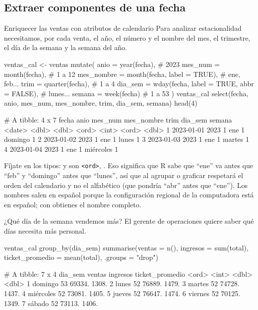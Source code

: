 \subsection{Extraer componentes de una fecha}

\begin{ejemplo}{Enriquecer las ventas con atributos de calendario}
Para analizar estacionalidad necesitamos, por cada venta, el año, el número
y el nombre del mes, el trimestre, el día de la semana y la semana del año.
\end{ejemplo}

\begin{rcode}
ventas_cal <- ventas %
  mutate(
    anio       = year(fecha),                           # 2023
    mes_num    = month(fecha),                          # 1 a 12
    mes_nombre = month(fecha, label = TRUE),            # ene, feb...
    trim       = quarter(fecha),                        # 1 a 4
    dia_sem    = wday(fecha, label = TRUE, abbr = FALSE), # lunes...
    semana     = week(fecha)                            # 1 a 53
  )
ventas_cal %
  select(fecha, anio, mes_num, mes_nombre, trim, dia_sem, semana) %
  head(4)
\end{rcode}
\begin{rsalida}
# A tibble: 4 x 7
  fecha       anio mes_num mes_nombre  trim dia_sem   semana
  <date>     <dbl>   <dbl> <ord>      <int> <ord>      <dbl>
1 2023-01-01  2023       1 ene            1 domingo        1
2 2023-01-02  2023       1 ene            1 lunes          1
3 2023-01-03  2023       1 ene            1 martes         1
4 2023-01-04  2023       1 ene            1 miércoles      1
\end{rsalida}

Fíjate en los tipos:  y  son
\texttt{<ord>}, . Eso significa que R sabe que
``ene'' va antes que ``feb'' y ``domingo'' antes que ``lunes'', así que al
agrupar o graficar respetará el orden del calendario y no el alfabético (que
pondría ``abr'' antes que ``ene''). Los nombres salen en español porque la
configuración regional de la computadora está en español; con
 obtienes el nombre completo.

\begin{ejemplo}{¿Qué día de la semana vendemos más?}
El gerente de operaciones quiere saber qué días necesita más personal.
\end{ejemplo}

\begin{rcode}
ventas_cal %
  group_by(dia_sem) %
  summarise(ventas = n(), ingresos = sum(total),
            ticket_promedio = mean(total), .groups = "drop")
\end{rcode}
\begin{rsalida}
# A tibble: 7 x 4
  dia_sem   ventas ingresos ticket_promedio
  <ord>      <int>    <dbl>           <dbl>
1 domingo       53   69334.           1308.
2 lunes         52   76889.           1479.
3 martes        52   74728.           1437.
4 miércoles     52   73081.           1405.
5 jueves        52   76647.           1474.
6 viernes       52   70125.           1349.
7 sábado        52   73113.           1406.
\end{rsalida}

